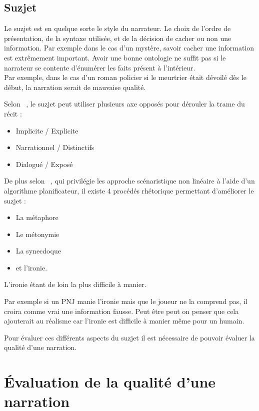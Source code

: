 \documentclass[asi]{picINSA}
\begin{document}
\subsection{Suzjet}

Le suzjet est en quelque sorte le style du narrateur. Le choix de l'ordre de présentation, de la syntaxe utilisée, et de la décision de cacher ou non une information. Par exemple dans le cas d'un mystère, savoir cacher une information est extrêmement important. Avoir une bonne ontologie ne suffit pas si le narrateur se contente d'énumérer les faits présent à l'intérieur. \\

Par exemple, dans le cas d'un roman policier si le meurtrier était dévoilé dès le début, la narration serait de mauvaise qualité.

Selon ~\cite{callaway2002narrative}, le suzjet peut utiliser plusieurs axe opposés pour dérouler la trame du récit :
\begin{itemize}
\item Implicite / Explicite
\item Narrationnel / Distinctifs
\item Dialogué / Exposé \\
\end{itemize}

De plus selon ~\cite{Ciarlini:2010:ERP:1658866.1658874}, qui privilégie les approche scénaristique non linéaire à l'aide d'un algorithme planificateur, il existe 4 procédés rhétorique permettant d'améliorer le suzjet :
\begin{itemize}
\item La métaphore
\item Le métonymie
\item La synecdoque
\item et l'ironie.
\end{itemize}
L'ironie étant de loin la plus difficile à manier.

Par exemple si un PNJ manie l'ironie mais que le joueur ne la comprend pas, il croira comme vrai une information fausse. Peut être peut on penser que cela ajouterait au réalisme car l'ironie est difficile à manier même pour un humain.

Pour évaluer ces différents aspects du suzjet il est nécessaire de pouvoir évaluer la qualité d'une narration.

\section{Évaluation de la qualité d'une narration}
\end{document}
